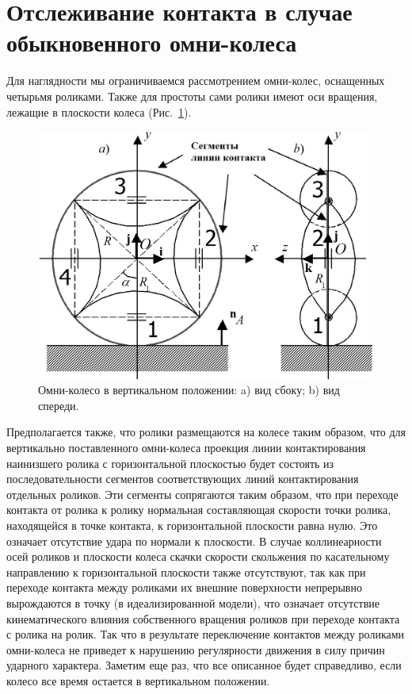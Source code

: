 \section{Отслеживание контакта в случае обыкновенного омни-колеса}

Для наглядности мы ограничиваемся рассмотрением омни-колес, 
оснащенных четырьмя роликами. Также для простоты сами ролики имеют оси 
вращения, лежащие в плоскости колеса (Рис.~\ref{OmniWheel}).

\begin{figure}[htb]
\centering\includegraphics[width=13cm]{content/parts/3_friction/nd/OmniWheel.eps}
\caption{Омни-колесо в вертикальном положении: a) вид сбоку; b) вид спереди.}
\label{OmniWheel}
\end{figure}

Предполагается также, что ролики размещаются на колесе таким образом, что для 
вертикально поставленного омни-колеса проекция линии контактирования наинизшего 
ролика с горизонтальной плоскостью будет состоять из последовательности 
сегментов соответствующих линий контактирования отдельных роликов. Эти сегменты 
сопрягаются таким образом, что при переходе контакта от ролика к ролику 
нормальная составляющая скорости точки ролика, находящейся в точке контакта, к 
горизонтальной плоскости равна нулю. Это означает отсутствие удара по нормали к 
плоскости. В случае коллинеарности осей роликов и плоскости колеса скачки 
скорости скольжения по касательному направлению к горизонтальной плоскости 
также отсутствуют, так как при переходе контакта между роликами их внешние 
поверхности непрерывно вырождаются в точку (в идеализированной модели), что 
означает отсутствие кинематического влияния собственного вращения роликов при 
переходе контакта с ролика на ролик. Так что в результате переключение 
контактов между роликами омни-колеса не приведет к нарушению регулярности 
движения в силу причин ударного характера. Заметим еще раз, что все описанное 
будет справедливо, если колесо все время остается в вертикальном положении.

